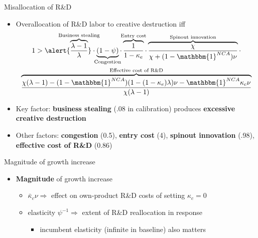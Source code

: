 \documentclass[english,usenames,dvipsnames]{beamer}
\begin{document}
\begin{frame}{Misallocation of R\&D}\label{misallocation_of_rd}
	\begin{itemize}
		\item  Overallocation of R\&D labor to creative destruction iff  \hyperlink{misallocation_of_rd:derivation}{}
		\footnotesize
		\begin{multline*}
		1 > \alert{\overbrace{\frac{\lambda-1}{\lambda}}^{\mathclap{\text{Business stealing}}}} \cdot \underbrace{(1-\psi)}_{\mathclap{\text{Congestion}}}   \cdot \overbrace{\frac{1}{1-\kappa_{e}}}^{\mathclap{\text{Entry cost}}} \cdot \overbrace{\frac{\chi}{\chi + (1-\mathbbm{1}^{NCA})\nu}}^{\mathclap{\text{Spinout innovation}}} \cdot \\ \overbrace{\frac{\chi(\lambda-1) -(1-\mathbbm{1}^{NCA}) (1-(1-\kappa_e)\lambda)\nu - \mathbbm{1}^{NCA} \kappa_c \nu}{\chi(\lambda-1)}}^{\mathclap{\text{Effective cost of R\&D}}}  \label{eq:RD_reallocation} 
		\end{multline*}
		\normalsize
		\smallskip
		\item  Key factor: \alert{\textbf{business stealing}} (.08 in calibration) produces \alert{\textbf{excessive creative destruction}} 
		\smallskip
		\item Other factors: \alert{\textbf{congestion}} (0.5), \alert{\textbf{entry cost}} (4), \alert{\textbf{spinout innovation}} (.98), \alert{\textbf{effective cost of R\&D}} (0.86)
	\end{itemize}
\end{frame}

\begin{frame}{Magnitude of growth increase}\label{policy:magnitudeOfGrowthIncrease}
	\begin{itemize}
		\item \alert{\textbf{Magnitude}} of growth increase \hyperlink{magnitude_of_growth_increase}{}
		\begin{itemize}
			\smallskip
			\item  $\bar{\kappa}_c \nu \Rightarrow$ effect on own-product R\&D costs of setting $\kappa_c = 0$ 
			\smallskip
			\item  elasticity $\psi^{-1} \Rightarrow$ extent of R\&D reallocation in response
			\begin{itemize}
				\item incumbent elasticity (infinite in baseline) also matters \hyperlink{reducing_kappa_c_table:incumbentDRS}{}
			\end{itemize}
		\end{itemize}
	\end{itemize} 
\end{frame}
\end{document}
